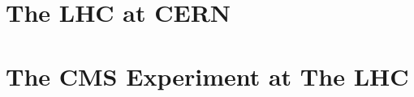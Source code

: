\chapter{The LHC at CERN}
\label{c:lhc}





\chapter{The CMS Experiment at The LHC}
\label{c:secCMS}










